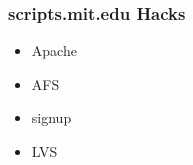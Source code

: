 \begin{frame}
  \frametitle{scripts.mit.edu Hacks}
  \begin{itemize}
      \item Apache
      \item AFS
      \item signup
      \item LVS
  \end{itemize}
\end{frame}

